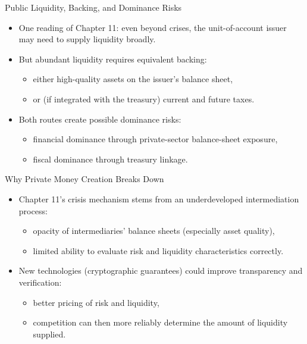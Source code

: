 \documentclass[11pt,aspectratio=169]{beamer}
\begin{document}
\begin{frame}{Public Liquidity, Backing, and Dominance Risks}
\small
\begin{itemize}
  \item One reading of Chapter 11: even beyond crises, the unit-of-account issuer may need to supply liquidity broadly.
  \item But abundant liquidity requires equivalent backing:
  \begin{itemize}
    \item either high-quality assets on the issuer’s balance sheet,
    \item or (if integrated with the treasury) current and future taxes.
  \end{itemize}
  \item Both routes create possible dominance risks:
  \begin{itemize}
    \item financial dominance through private-sector balance-sheet exposure,
    \item fiscal dominance through treasury linkage.
  \end{itemize}
\end{itemize}
\end{frame}

\begin{frame}{Why Private Money Creation Breaks Down}
\small
\begin{itemize}
  \item Chapter 11’s crisis mechanism stems from an underdeveloped intermediation process:
  \begin{itemize}
    \item opacity of intermediaries’ balance sheets (especially asset quality),
    \item limited ability to evaluate risk and liquidity characteristics correctly.
  \end{itemize}
  \item New technologies (cryptographic guarantees) could improve transparency and verification:
  \begin{itemize}
    \item better pricing of risk and liquidity,
    \item competition can then more reliably determine the amount of liquidity supplied.
  \end{itemize}
\end{itemize}
\end{frame}
\end{document}
